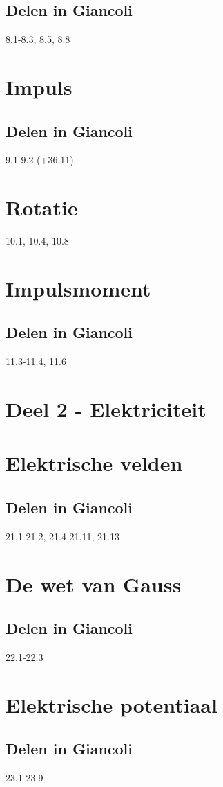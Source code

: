 \documentclass[12pt,a4paper]{article}
\begin{document}
	\subsection{Delen in Giancoli}
	8.1-8.3, 8.5, 8.8
	\section{Impuls}
	\subsection{Delen in Giancoli}
	9.1-9.2 (+36.11)
	\section{Rotatie}
	10.1, 10.4, 10.8
	\section{Impulsmoment}
	\subsection{Delen in Giancoli}
	11.3-11.4, 11.6
	\newpage
	
	
	\section{Deel 2 - Elektriciteit}
	\section{Elektrische velden}
	\subsection{Delen in Giancoli}
	21.1-21.2, 21.4-21.11, 21.13 
	\section{De wet van Gauss}
	\subsection{Delen in Giancoli}
	22.1-22.3
	\section{Elektrische potentiaal}
	\subsection{Delen in Giancoli}
	23.1-23.9
\end{document}
